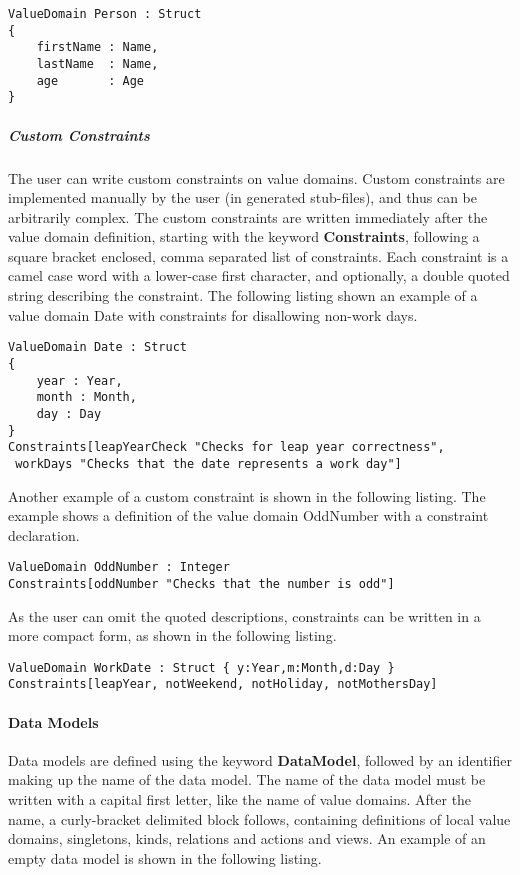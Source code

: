 \begin{lstlisting}[language=edma]
ValueDomain Person : Struct
{
	firstName : Name,
	lastName  : Name,
	age       : Age
}
\end{lstlisting}


\subparagraph{Custom Constraints}

The user can write custom constraints on value domains. Custom constraints
are implemented manually by the user (in generated stub-files), and
thus can be arbitrarily complex. The custom constraints are written
immediately after the value domain definition, starting with the keyword
\textbf{Constraints}, following a square bracket enclosed, comma separated
list of constraints. Each constraint is a camel case word with a lower-case
first character, and optionally, a double quoted string describing
the constraint. The following listing shown an example of a value
domain Date with constraints for disallowing non-work days.

\begin{lstlisting}[language=edma]
ValueDomain Date : Struct
{
	year : Year,
	month : Month,
	day : Day
} 
Constraints[leapYearCheck "Checks for leap year correctness",
 workDays "Checks that the date represents a work day"]
\end{lstlisting}

Another example of a custom constraint is shown in the following listing.
The example shows a definition of the value domain OddNumber with
a constraint declaration.

\begin{lstlisting}[language=edma]
ValueDomain OddNumber : Integer 
Constraints[oddNumber "Checks that the number is odd"]
\end{lstlisting}

As the user can omit the quoted descriptions, constraints can be written
in a more compact form, as shown in the following listing.

\begin{lstlisting}[language=edma]
ValueDomain WorkDate : Struct { y:Year,m:Month,d:Day }
Constraints[leapYear, notWeekend, notHoliday, notMothersDay]
\end{lstlisting}


\paragraph{Data Models}

Data models are defined using the keyword \textbf{DataModel}, followed
by an identifier making up the name of the data model. The name of
the data model must be written with a capital first letter, like the
name of value domains. After the name, a curly-bracket delimited block
follows, containing definitions of local value domains, singletons,
kinds, relations and actions and views. An example of an empty data
model is shown in the following listing.

